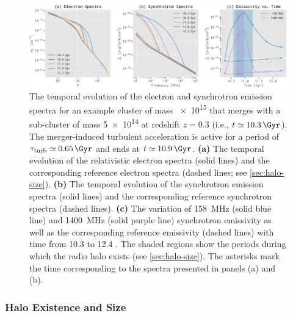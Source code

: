 \documentclass[twocolumn]{aastex62}
\newcommand{\R}[1]{\mathrm{#1}}
\newcommand{\editone}[1]{{\leavevmode\color{cyan}#1}}
\begin{document}
\begin{figure}
  \centering
  \includegraphics[width=\textwidth]{spec-evo-example}
  \caption{\label{fig:spec-evo}\editone{%
    The temporal evolution of the electron and synchrotron
    emission spectra for an example cluster of mass
    \SI{e15}{\solarmass} that merges with a sub-cluster of mass
    \SI{5e14}{\solarmass} at redshift $z = 0.3$
    (i.e., $t \simeq \SI{10.3}{\Gyr}$).
    The merger-induced turbulent acceleration is active for a period of
    $\tau_{\R{turb}} \simeq \SI{0.65}{\Gyr}$ and ends at
    $t \simeq \SI{10.9}{\Gyr}$.
    \textbf{(a)} The temporal evolution of the relativistic electron
    spectra (solid lines) and the corresponding reference electron spectra
    (dashed lines; see \autoref{sec:halo-size}).
    \textbf{(b)} The temporal evolution of the synchrotron emission spectra
    (solid lines) and the corresponding reference synchrotron spectra
    (dashed lines).
    \textbf{(c)} The variation of \SI{158}{\MHz} (solid blue line) and
    \SI{1400}{\MHz} (solid purple line) synchrotron emissivity as well as
    the corresponding reference emissivity (dashed lines) with time from
    10.3 to 12.4 \si{\Gyr}.
    The shaded regions show the periods during which the radio halo exists
    (see \autoref{sec:halo-size}).
    The asterisks mark the time corresponding to the spectra presented in
    panels (a) and (b).
  }}
\end{figure}


\subsubsection{\editone{Halo Existence and Size}}
\label{sec:halo-size}
\end{document}
